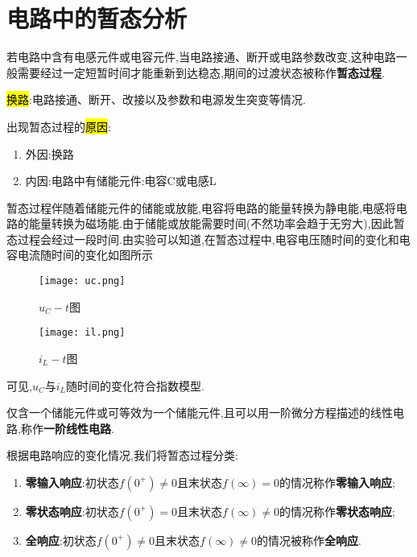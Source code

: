 \section{\K 电路中的暂态分析}
\begin{definition}[暂态过程]
    \Par 若电路中含有电感元件或电容元件,当电路接通、断开或电路参数改变,这种电路一般需要经过一定短暂时间才能重新到达稳态,期间的过渡状态被称作\textbf{暂态过程}.
\end{definition}
\hl{换路}:电路接通、断开、改接以及参数和电源发生突变等情况.

出现暂态过程的\hl{原因}:
\begin{enumerate}
    \item 外因:换路
    \item 内因:电路中有储能元件:电容C或电感L
\end{enumerate}
\Par 暂态过程伴随着储能元件的储能或放能,电容将电路的能量转换为静电能,电感将电路的能量转换为磁场能.由于储能或放能需要时间(不然功率会趋于无穷大),因此暂态过程会经过一段时间.由实验可以知道,在暂态过程中,电容电压随时间的变化和电容电流随时间的变化如图所示
\begin{figure}[htbp]
    \centering
    \begin{minipage}{0.48\textwidth}
        \centering
        \texttt{[image: uc.png]}
        \caption{$u_C-t$图}
    \end{minipage}
    \begin{minipage}{0.48\textwidth}
        \centering
        \texttt{[image: il.png]}
        \caption{$i_L-t$图}
    \end{minipage}
\end{figure}

可见,$u_C$与$i_L$随时间的变化符合指数模型.
\begin{definition}[一阶线性电路]
    \Par 仅含一个储能元件或可等效为一个储能元件,且可以用一阶微分方程描述的线性电路,称作\textbf{一阶线性电路}.
\end{definition}
根据电路响应的变化情况,我们将暂态过程分类:
\begin{enumerate}
    \item \textbf{零输入响应}:初状态$f\left( 0^+ \right) \ne 0$且末状态$f\left( \infty \right) =0$的情况称作\textbf{零输入响应};
    \item \textbf{零状态响应}:初状态$f\left( 0^+ \right) =0$且末状态$f\left( \infty \right) \ne 0$的情况称作\textbf{零状态响应};
    \item \textbf{全响应}:初状态$f\left( 0^+ \right) \ne 0$且末状态$f\left( \infty \right) \ne 0$的情况被称作\textbf{全响应}.
\end{enumerate}

